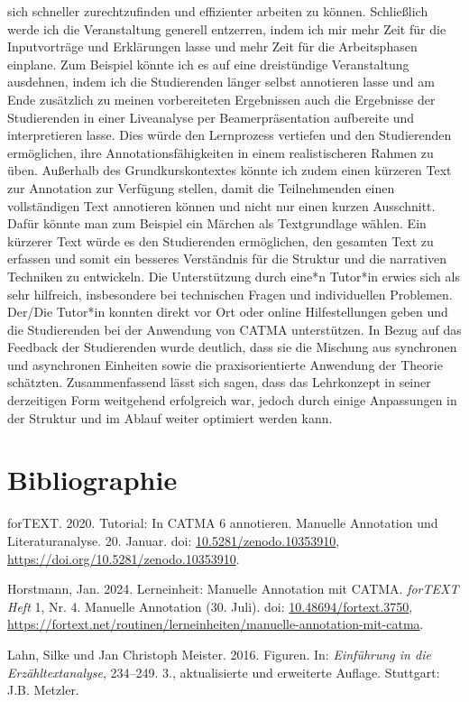 \documentclass[
          a4paper,
        ]{article}
\newlength{\cslhangindent}
\newenvironment{CSLReferences}[2] %
 {\begin{list}{}{%
  \setlength{\itemindent}{0pt}
  \setlength{\leftmargin}{0pt}
  \setlength{\parsep}{0pt}
  \ifodd #1
   \setlength{\leftmargin}{\cslhangindent}
   \setlength{\itemindent}{-1\cslhangindent}
  \fi
  \setlength{\itemsep}{#2\baselineskip}}}
 {\end{list}}
\begin{document}
sich schneller zurechtzufinden und effizienter arbeiten zu können.
Schließlich werde ich die Veranstaltung generell entzerren, indem ich
mir mehr Zeit für die Inputvorträge und Erklärungen lasse und mehr Zeit
für die Arbeitsphasen einplane. Zum Beispiel könnte ich es auf eine
dreistündige Veranstaltung ausdehnen, indem ich die Studierenden länger
selbst annotieren lasse und am Ende zusätzlich zu meinen vorbereiteten
Ergebnissen auch die Ergebnisse der Studierenden in einer Liveanalyse
per Beamerpräsentation aufbereite und interpretieren lasse. Dies würde
den Lernprozess vertiefen und den Studierenden ermöglichen, ihre
Annotationsfähigkeiten in einem realistischeren Rahmen zu üben.
Außerhalb des Grundkurskontextes könnte ich zudem einen kürzeren Text
zur Annotation zur Verfügung stellen, damit die Teilnehmenden einen
vollständigen Text annotieren können und nicht nur einen kurzen
Ausschnitt. Dafür könnte man zum Beispiel ein Märchen als Textgrundlage
wählen. Ein kürzerer Text würde es den Studierenden ermöglichen, den
gesamten Text zu erfassen und somit ein besseres Verständnis für die
Struktur und die narrativen Techniken zu entwickeln. Die Unterstützung
durch eine*n Tutor*in erwies sich als sehr hilfreich, insbesondere bei
technischen Fragen und individuellen Problemen. Der/Die Tutor*in konnten
direkt vor Ort oder online Hilfestellungen geben und die Studierenden
bei der Anwendung von CATMA unterstützen. In Bezug auf das Feedback der
Studierenden wurde deutlich, dass sie die Mischung aus synchronen und
asynchronen Einheiten sowie die praxisorientierte Anwendung der Theorie
schätzten. Zusammenfassend lässt sich sagen, dass das Lehrkonzept in
seiner derzeitigen Form weitgehend erfolgreich war, jedoch durch einige
Anpassungen in der Struktur und im Ablauf weiter optimiert werden kann.

\section*{Bibliographie}\label{bibliography}

\label{refs}
\begin{CSLReferences}{1}{0}
forTEXT. 2020. Tutorial: In CATMA 6 annotieren. Manuelle Annotation und
Literaturanalyse. 20. Januar. doi:
\href{https://doi.org/10.5281/zenodo.10353910}{10.5281/zenodo.10353910},
\url{https://doi.org/10.5281/zenodo.10353910}.

Horstmann, Jan. 2024. Lerneinheit: Manuelle Annotation mit CATMA.
\emph{forTEXT Heft} 1, Nr. 4. Manuelle Annotation (30. Juli). doi:
\href{https://doi.org/10.48694/fortext.3750}{10.48694/fortext.3750},
\url{https://fortext.net/routinen/lerneinheiten/manuelle-annotation-mit-catma}.

Lahn, Silke und Jan Christoph Meister. 2016. Figuren. In:
\emph{Einführung in die Erzähltextanalyse}, 234--249. 3., aktualisierte
und erweiterte Auflage. Stuttgart: J.B. Metzler.

\end{CSLReferences}
\end{document}
